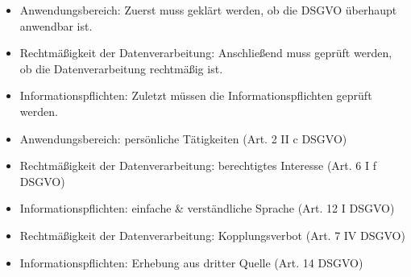 \documentclass{exercisesheet}
\begin{document}
\begin{solutions}
  \item
  \begin{itemize}
    \item Anwendungsbereich: Zuerst muss geklärt werden, ob die DSGVO überhaupt anwendbar ist.
    \item Rechtmäßigkeit der Datenverarbeitung: Anschließend muss geprüft werden, ob die Datenverarbeitung rechtmäßig ist.
    \item Informationspflichten: Zuletzt müssen die Informationspflichten geprüft werden.
  \end{itemize}
  \item
  \begin{itemize}
    \item Anwendungsbereich: persönliche Tätigkeiten (Art. 2 II c DSGVO)
    \item Rechtmäßigkeit der Datenverarbeitung: berechtigtes Interesse (Art. 6 I f DSGVO)
    \item Informationspflichten: einfache \& verständliche Sprache (Art. 12 I DSGVO)
    \item Rechtmäßigkeit der Datenverarbeitung: Kopplungsverbot (Art. 7 IV DSGVO)
    \item Informationspflichten: Erhebung aus dritter Quelle (Art. 14 DSGVO)
  \end{itemize}
\end{solutions}
\end{document}
